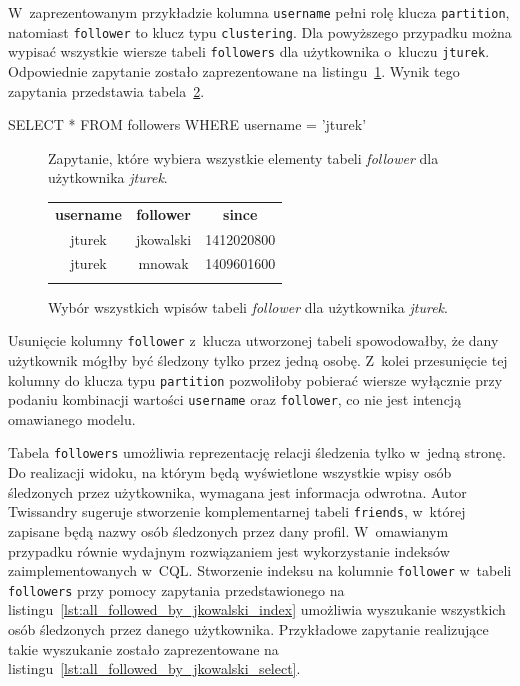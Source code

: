 W~zaprezentowanym przykładzie kolumna \verb+username+ pełni rolę klucza \verb+partition+, natomiast \verb+follower+ to klucz typu \verb+clustering+. Dla powyższego przypadku można wypisać wszystkie wiersze tabeli \verb+followers+ dla użytkownika o~kluczu \verb+jturek+. Odpowiednie zapytanie zostało zaprezentowane na listingu~\ref{lst:all_jturek_followers}. Wynik tego zapytania przedstawia tabela~\ref{tab:all_jturek_followers}.

\begin{verbbox}
	SELECT * FROM followers WHERE username = 'jturek'
\end{verbbox}

\begin{figure}[ht!]
	\centering
	\theverbbox
	\caption{Zapytanie, które wybiera wszystkie elementy tabeli \emph{follower} dla użytkownika \emph{jturek}.}
	\label{lst:all_jturek_followers}
\end{figure}

\begin{figure}[ht!]
	\centering
	\begin{tabular}{|c|c|c|}
		\hhline{|---|}
		\textbf{username} & \textbf{follower} & \textbf{since} \\
		\hhline{|===|}
		jturek & jkowalski & 1412020800 \\
		jturek & mnowak & 1409601600 \\
		\hhline{|---|}
	\end{tabular} 

	\caption{Wybór wszystkich wpisów tabeli \emph{follower} dla użytkownika \emph{jturek}.}
	\label{tab:all_jturek_followers}
\end{figure}

Usunięcie kolumny \verb+follower+ z~klucza utworzonej tabeli spowodowałby, że dany użytkownik mógłby być śledzony tylko przez jedną osobę. Z~kolei przesunięcie tej kolumny do klucza typu \verb+partition+ pozwoliłoby pobierać wiersze wyłącznie przy podaniu kombinacji wartości \verb+username+ oraz \verb+follower+, co nie jest intencją omawianego modelu.

Tabela \verb+followers+ umożliwia reprezentację relacji śledzenia tylko w~jedną stronę. Do realizacji widoku, na którym będą wyświetlone wszystkie wpisy osób śledzonych przez użytkownika, wymagana jest informacja odwrotna. Autor Twissandry sugeruje stworzenie komplementarnej tabeli \verb+friends+, w~której zapisane będą nazwy osób śledzonych przez dany profil. W~omawianym przypadku równie wydajnym rozwiązaniem jest wykorzystanie indeksów zaimplementowanych w~CQL. Stworzenie indeksu na kolumnie \verb+follower+ w~tabeli \verb+followers+ przy pomocy zapytania przedstawionego na listingu~\ref{lst:all_followed_by_jkowalski_index} umożliwia wyszukanie wszystkich osób śledzonych przez danego użytkownika. Przykładowe zapytanie realizujące takie wyszukanie zostało zaprezentowane na listingu~\ref{lst:all_followed_by_jkowalski_select}.

